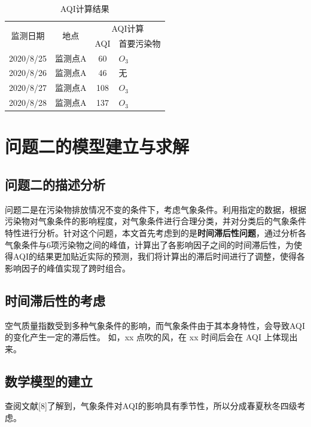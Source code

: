 \documentclass[a4paper,10pt]{my_paper}
\numberwithin{equation}{section}
\begin{document}
\begin{table}[htbp]
    \centering
    \caption{AQI计算结果}\label{tab3}%
      \begin{tabular}{cccp{5em}}
      \toprule
      \multirow{2}[2]{*}{监测日期} & \multirow{2}[2]{*}{地点} & \multicolumn{2}{c}{AQI计算} \\
            &       & \multicolumn{1}{p{4.055em}}{AQI} & 首要污染物 \\
      \midrule
      2020/8/25 & 监测点A  & 60    & ${O_3}$ \\
      2020/8/26 & 监测点A  & 46    & 无 \\
      2020/8/27 & 监测点A  & 108   & ${O_3}$ \\
      2020/8/28 & 监测点A  & 137   & ${O_3}$ \\
      \bottomrule
      \end{tabular}%
  \end{table}%
  


\section{问题二的模型建立与求解}
\subsection{问题二的描述分析}
问题二是在污染物排放情况不变的条件下，考虑气象条件。利用指定的数据，根据污染物对气象条件的影响程度，对气象条件进行合理分类，并对分类后的气象条件特性进行分析。针对这个问题，本文首先考虑到的是\textbf{时间滞后性问题}，通过分析各气象条件与6项污染物之间的峰值，计算出了各影响因子之间的时间滞后性，为使得AQI的结果更加贴近实际的预测，我们将计算出的滞后时间进行了调整，使得各影响因子的峰值实现了跨时组合。

\subsection{时间滞后性的考虑}
空气质量指数受到多种气象条件的影响，而气象条件由于其本身特性，会导致AQI的变化产生一定的滞后性。
如，xx 点吹的风，在 xx 时间后会在 AQI 上体现出来。%

\subsection{数学模型的建立}
查阅文献[8]了解到，气象条件对AQI的影响具有季节性，所以分成春夏秋冬四级考虑。
\end{document}
